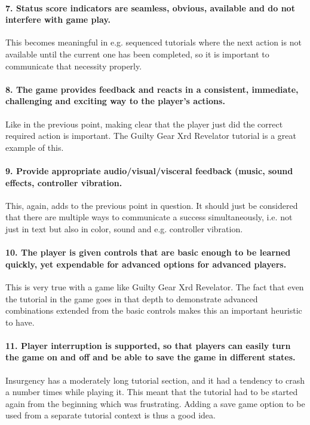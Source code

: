 \paragraph{7. Status score indicators are seamless, obvious, available and do not interfere with game play.}
This becomes meaningful in e.g. sequenced tutorials where the next action is not available until the current one has been completed, so it is important to communicate that necessity properly.

\paragraph{8. The game provides feedback and reacts in a consistent, immediate, challenging and exciting way to the player's actions.} Like in the previous point, making clear that the player just did the correct required action is important. The Guilty Gear Xrd Revelator tutorial is a great example of this.

\paragraph{9. Provide appropriate audio/visual/visceral feedback (music, sound effects, controller vibration.} This, again, adds to the previous point in question. It should just be considered that there are multiple ways to communicate a success simultaneously, i.e. not just in text but also in color, sound and e.g. controller vibration.

\paragraph{10. The player is given controls that are basic enough to be learned quickly, yet expendable for advanced options for advanced players.} This is very true with a game like Guilty Gear Xrd Revelator. The fact that even the tutorial in the game goes in that depth to demonstrate advanced combinations extended from the basic controls makes this an important heuristic to have.

\paragraph{11. Player interruption is supported, so that players can easily turn the game on and off and be able to save the game in different states.} Insurgency has a moderately long tutorial section, and it had a tendency to crash a number times while playing it. This meant that the tutorial had to be started again from the beginning which was frustrating. Adding a save game option to be used from a separate tutorial context is thus a good idea.

